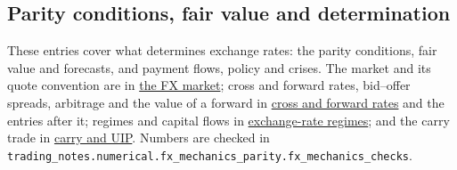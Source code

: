 \subsection{Parity conditions, fair value and determination}

These entries cover what determines exchange rates: the parity conditions, fair value and forecasts, and payment flows, policy and crises. The market and its quote convention are in \hyperref[def:fx-market-real-exchange-rates]{the FX market}; cross and forward rates, bid--offer spreads, arbitrage and the value of a forward in \hyperref[meth:cross-forward-rates]{cross and forward rates} and the entries after it; regimes and capital flows in \hyperref[def:exchange-rate-regimes-capital-flows]{exchange-rate regimes}; and the carry trade in \hyperref[meth:carry-trade-uip]{carry and UIP}. Numbers are checked in \nolinkurl{trading_notes.numerical.fx_mechanics_parity.fx_mechanics_checks}.

